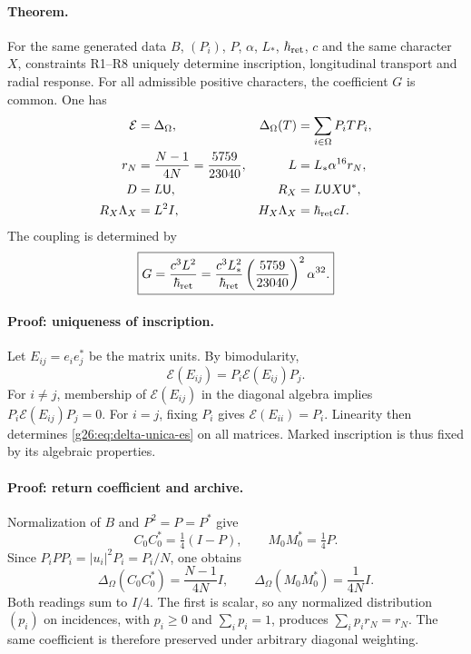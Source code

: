\paragraph{Theorem.}
For the same generated data \(B\), \((P_i)\), \(P\), \(\alpha\), \(L_*\), \(\hbar_{\rm ret}\), \(c\) and the same character \(X\), constraints R1--R8 uniquely determine inscription, longitudinal transport and radial response. For all admissible positive characters, the coefficient \(G\) is common. One has
\begin{align}
 \mathcal E&=\Delta_\Omega,
 &\Delta_\Omega(T)&=\sum_{i\in\Omega}P_iTP_i,\label{g26:eq:delta-unica-es}\\
 r_N&=\frac{N-1}{4N}=\frac{5759}{23040},
 &L&=L_*\alpha^{16}r_N,\label{g26:eq:longitud-unica-es}\\
 D&=L\mathsf U,
 &R_X&=L\mathsf U X\mathsf U^*,\label{g26:eq:radial-unica-es}\\
 R_X\Lambda_X&=L^2I,
 &H_X\Lambda_X&=\hbar_{\rm ret}cI.\label{g26:eq:productos-radiales-es}
\end{align}
The coupling is determined by
\begin{equation}
 \boxed{G=\frac{c^3L^2}{\hbar_{\rm ret}}
 =\frac{c^3L_*^2}{\hbar_{\rm ret}}
   \left(\frac{5759}{23040}\right)^2\alpha^{32}.}
 \label{g26:eq:g-rigido-es}
\end{equation}

\paragraph{Proof: uniqueness of inscription.}
Let \(E_{ij}=e_ie_j^*\) be the matrix units. By bimodularity,
\[
 \mathcal E(E_{ij})=P_i\mathcal E(E_{ij})P_j.
\]
For \(i\ne j\), membership of \(\mathcal E(E_{ij})\) in the diagonal algebra implies \(P_i\mathcal E(E_{ij})P_j=0\). For \(i=j\), fixing \(P_i\) gives \(\mathcal E(E_{ii})=P_i\). Linearity then determines \eqref{g26:eq:delta-unica-es} on all matrices. Marked inscription is thus fixed by its algebraic properties.

\paragraph{Proof: return coefficient and archive.}
Normalization of \(B\) and \(P^2=P=P^*\) give
\[
 C_0C_0^*=\tfrac14(I-P),\qquad M_0M_0^*=\tfrac14P.
\]
Since \(P_iPP_i=|u_i|^2P_i=P_i/N\), one obtains
\begin{equation}
 \Delta_\Omega(C_0C_0^*)=\frac{N-1}{4N}I,
 \qquad
 \Delta_\Omega(M_0M_0^*)=\frac{1}{4N}I.
 \label{g26:eq:retorno-y-memoria-es}
\end{equation}
Both readings sum to \(I/4\). The first is scalar, so any normalized distribution \((p_i)\) on incidences, with \(p_i\geq0\) and \(\sum_i p_i=1\), produces \(\sum_i p_i r_N=r_N\). The same coefficient is therefore preserved under arbitrary diagonal weighting.

